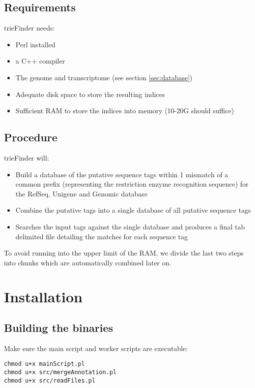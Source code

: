 \documentclass[a4paper,12pt]{article}
\begin{document}
\subsection{Requirements}

trieFinder needs:

\begin{itemize}
\item Perl installed
\item a C++ compiler
\item The genome and transcriptome (see section \ref{sec:database})
\item Adequate disk space to store the resulting indices
\item Sufficient RAM to store the indices into memory (10-20G should suffice)
\end{itemize}


\subsection{Procedure}

trieFinder will:

\begin{itemize}
\item Build a database of the putative sequence tags within 1 mismatch of a common prefix (representing the restriction enzyme recognition sequence) for the RefSeq, Unigene and Genomic database 
\item Combine the putative tags into a single database of all putative sequence tags
\item Searches the input tags against the single database and produces a final tab delimited file detailing the matches for each sequence tag
\end{itemize}

To avoid running into the upper limit of the RAM, we divide the last two steps into chunks which are automatically combined later on.



\section{Installation}

\subsection{Building the binaries}

Make sure the main script and worker scripts are executable:
\small{
\begin{verbatim}
chmod u+x mainScript.pl
chmod u+x src/mergeAnnotation.pl
chmod u+x src/readFiles.pl
\end{verbatim}
}
\end{document}
